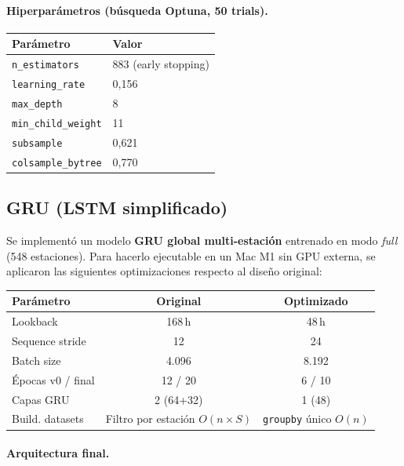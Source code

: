 \documentclass[12pt,a4paper]{article}
\begin{document}
\paragraph{Hiperparámetros (búsqueda Optuna, 50 trials).}
\begin{center}
\begin{tabular}{ll}
\toprule
\textbf{Parámetro} & \textbf{Valor} \\
\midrule
\texttt{n\_estimators}    & 883 (early stopping) \\
\texttt{learning\_rate}   & 0,156 \\
\texttt{max\_depth}       & 8 \\
\texttt{min\_child\_weight} & 11 \\
\texttt{subsample}        & 0,621 \\
\texttt{colsample\_bytree} & 0,770 \\
\bottomrule
\end{tabular}
\end{center}

\subsection{GRU (LSTM simplificado)}

Se implementó un modelo \textbf{GRU global multi-estación} entrenado en modo
\textit{full} (548 estaciones). Para hacerlo ejecutable en un Mac M1 sin GPU externa,
se aplicaron las siguientes optimizaciones respecto al diseño original:

\begin{center}
\begin{tabular}{lcc}
\toprule
\textbf{Parámetro} & \textbf{Original} & \textbf{Optimizado} \\
\midrule
Lookback          & 168\,h & 48\,h \\
Sequence stride   & 12     & 24    \\
Batch size        & 4.096  & 8.192 \\
Épocas v0 / final & 12 / 20 & 6 / 10 \\
Capas GRU         & 2 (64+32) & 1 (48) \\
Build. datasets   & Filtro por estación $O(n{\times}S)$ & \texttt{groupby} único $O(n)$ \\
\bottomrule
\end{tabular}
\end{center}

\paragraph{Arquitectura final.}
\end{document}
